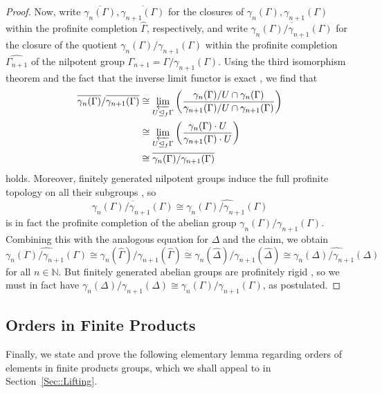 \documentclass{amsart}
\numberwithin{theorem}{section}
\numberwithin{equation}{section}
\newcommand{\hD}{\widehat{\Delta}}
\newcommand{\hG}{\widehat{\Gamma}}
\begin{document}
\begin{proof}
   Now, write $\overline{\gamma_n(\Gamma)},\overline{\gamma_{n+1}(\Gamma)}$ for the closures of $\gamma_n(\Gamma),\gamma_{n+1}(\Gamma)$ within the profinite completion $\hG$, respectively, and write $\overline{\gamma_n(\Gamma)/\gamma_{n+1}(\Gamma)}$ for the closure of the quotient $\gamma_n(\Gamma)/\gamma_{n+1}(\Gamma)$ within the profinite completion $\widehat{\Gamma_{n+1}}$ of the nilpotent group $\Gamma_{n+1} = \Gamma / \gamma_{n+1}(\Gamma)$. Using the third isomorphism theorem and the fact that the inverse limit functor is exact \cite[Proposition 2.2.4]{Ribes2010}, we find that
\begin{align}\label{Eq::SecondIsomorphismThm}
\overline{\gamma_n(\Gamma)}/\overline{\gamma_{n+1}(\Gamma)} &\cong \varprojlim_{ U\trianglelefteq_f \Gamma} \left(\frac{\gamma_n(\Gamma)/U \cap \gamma_n(\Gamma)}{\gamma_{n+1}(\Gamma)/ U \cap  \gamma_{n+1}(\Gamma)}\right) \\
&\cong \varprojlim_{U\trianglelefteq_f \Gamma} \left(\frac{\gamma_n(\Gamma)\cdot U}{\gamma_{n+1}(\Gamma) \cdot  U}\right) \\
&\cong \overline{\gamma_n(\Gamma)/\gamma_{n+1}(\Gamma)}
   \end{align}
holds. Moreover, finitely generated nilpotent groups induce the full profinite topology on all their subgroups \cite[p. 223]{Segal1983}, so 
\begin{equation}
\overline{\gamma_n(\Gamma)/\gamma_{n+1}(\Gamma)} \cong \widehat{\gamma_n(\Gamma)/\gamma_{n+1}(\Gamma)}
\end{equation}
is in fact the profinite completion of the abelian group $\gamma_n(\Gamma)/\gamma_{n+1}(\Gamma)$. Combining this with the analogous equation for $\Delta$ and the claim, we obtain
\begin{equation}
\widehat{\gamma_n(\Gamma)/\gamma_{n+1}(\Gamma)} \cong \gamma_n(\hG) / \gamma_{n+1}(\hG) \cong \gamma_n(\hD) / \gamma_{n+1}(\hD) \cong \widehat{\gamma_n(\Delta)/\gamma_{n+1}(\Delta)}
\end{equation}
for all $n \in \mathbb{N}$. But finitely generated abelian groups are profinitely rigid \cite[Corollary 3.2.12]{Wilkes2024}, so we must in fact have $\gamma_n(\Delta)/\gamma_{n+1}(\Delta) \cong \gamma_n(\Gamma)/\gamma_{n+1}(\Gamma)$, as postulated.
\end{proof}

\subsection{Orders in Finite Products} Finally, we state and prove the following elementary lemma regarding orders of elements in finite products groups, which we shall appeal to in Section~\ref{Sec::Lifting}.
\end{document}
